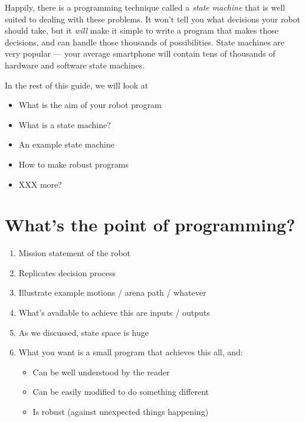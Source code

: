 \documentclass[a4paper,10pt]{article}
\begin{document}
Happily, there is a programming technique called a \textit{state machine} that
is well suited to dealing with these problems. It won't tell you what decisions
your robot should take, but it \textit{will} make it simple to write a program
that makes those decisions, and can handle those thousands of possibilities.
State machines are very popular --- your average smartphone will contain
tens of thousands of hardware and software state machines.

In the rest of this guide, we will look at
\begin{itemize}
	\item What is the aim of your robot program
	\item What is a state machine?
	\item An example state machine
	\item How to make robust programs
	\item XXX more?
\end{itemize}

\section{What's the point of programming?}
\begin{enumerate}
\item Mission statement of the robot
\item Replicates decision process
\item Illustrate example motions / arena path / whatever
\item What's available to achieve this are inputs / outputs
\item As we discussed, state space is huge
\item What you want is a small program that achieves this all, and:
\begin{itemize}
	\item Can be well understood by the reader
	\item Can be easily modified to do something different
	\item Is robust (against unexpected things happening)
\end{itemize}
\end{enumerate}
\end{document}
